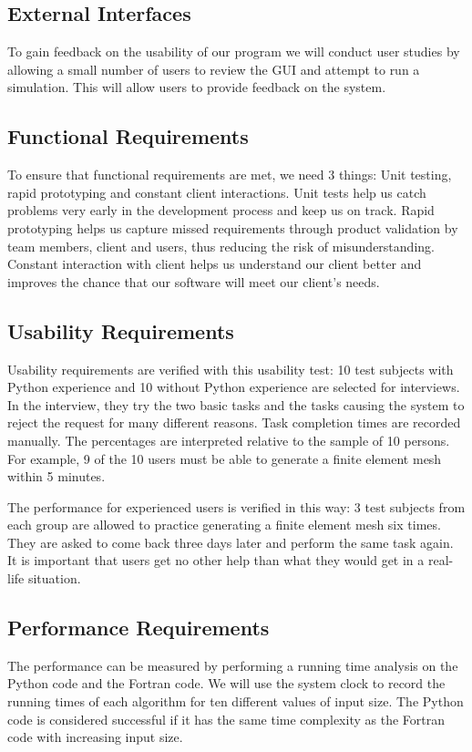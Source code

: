 \documentclass[draftclsnofoot,onecolumn,letterpaper,10pt,compsoc]{IEEEtran}
\begin{document}
\subsection{External Interfaces}
To gain feedback on the usability of our program we will conduct user studies by allowing a small number of users to review the GUI and attempt to run a simulation. This will allow users to provide feedback on the system.

\subsection{Functional Requirements}
To ensure that functional requirements are met, we need 3 things: Unit testing, rapid prototyping and constant client interactions. Unit tests help us catch problems very early in the development process and keep us on track. Rapid prototyping helps us capture missed requirements through product validation by team members, client and users, thus reducing the risk of misunderstanding. Constant interaction with client helps us understand our client better and improves the chance that our software will meet our client’s needs.

\subsection{Usability Requirements}
Usability requirements are verified with this usability test: 10 test subjects with Python experience and 10 without Python experience are selected for interviews. In the interview, they try the two basic tasks and the tasks causing the system to reject the request for many different reasons. Task completion times are recorded manually. The percentages are interpreted relative to the sample of 10 persons. For example, 9 of the 10 users must be able to generate a finite element mesh within 5 minutes.

The performance for experienced users is verified in this way: 3 test subjects from each group are allowed to practice generating a finite element mesh six times. They are asked to come back three days later and perform the same task again. It is important that users get no other help than what they would get in a real-life situation.

\subsection{Performance Requirements}
The performance can be measured by performing a running time analysis on the Python code and the Fortran code. We will use the system clock to record the running times of each algorithm for ten different values of input size. The Python code is considered successful if it has the same time complexity as the Fortran code with increasing input size.
\end{document}
